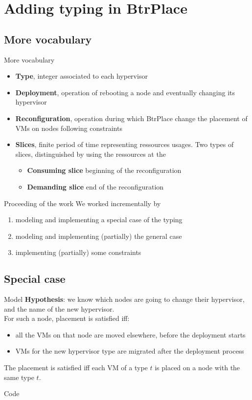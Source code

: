 \documentclass{beamer}
\begin{document}
\section{Adding typing in BtrPlace}
\subsection{More vocabulary}
\begin{frame}{More vocabulary}
\begin{itemize}
	\item{\textbf{Type}}, integer associated to each hypervisor
	\item{\textbf{Deployment}}, operation of rebooting a node and
		eventually changing its hypervisor
	\item{\textbf{Reconfiguration}}, operation during which BtrPlace
		change the placement of VMs on nodes following constraints
	\item{\textbf{Slices}}, finite period of time representing
		ressources usages. Two types of slices, distinguished by
		using the ressources at the
		\begin{itemize}
			\item{\textbf{Consuming slice}} beginning of the
				reconfiguration
			\item{\textbf{Demanding slice}} end of the reconfiguration
		\end{itemize}
\end{itemize}
\end{frame}
\begin{frame}{Proceeding of the work}
We worked incrementally by
\begin{enumerate}
	 \item modeling and implementing a special case of the typing
	 \item modeling and implementing (partially) the general case
	 \item implementing (partially) some constraints
\end{enumerate}
\end{frame}

\subsection{Special case}
\begin{frame}{Model}
\textbf{Hypothesis}: we know which nodes are going to change their hypervisor,
and the name of the new hypervisor.\\
For such a node, placement is satisfied iff:
\begin{itemize}
	\item all the VMs on that node are moved elsewhere, before the deployment
		starts
	\item VMs for the new hypervisor type are migrated after the deployment
		process
\end{itemize}
The placement is satisfied iff each VM of a type $t$ is placed on a node
with the same type $t$.
\end{frame}
\begin{frame}{Code}
\end{frame}
\end{document}
